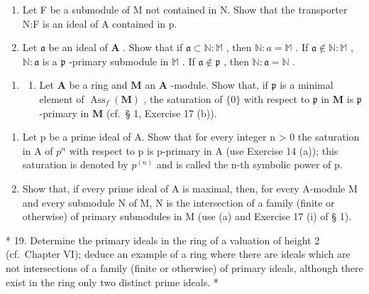 \begin{enumerate}
\def\labelenumi{(\alph{enumi})}
\item
  Let F be a submodule of M not contained in N. Show that the transporter N:F is an ideal of A contained in p.
\item
  Let \(\mathfrak{a}\) be an ideal of \(\mathbf{A}\) . Show that if \(\mathfrak{a} \subset \mathbb{N}: \mathbb{M}\) , then \(\mathbb{N}: a = \mathbb{M}\) . If \(\mathfrak{a} \notin \mathbb{N}: \mathbb{M}\) , \(\mathbb{N}: \mathfrak{a}\) is a \(\mathfrak{p}\) -primary submodule in \(\mathbb{M}\) . If \(\mathfrak{a} \notin \mathfrak{p}\) , then \(\mathbb{N}: \mathfrak{a} = \mathbb{N}\) .
\end{enumerate}

\begin{enumerate}
\def\labelenumi{\arabic{enumi}.}
\setcounter{enumi}{17}
\tightlist
\item
  \begin{enumerate}
  \def\labelenumii{(\alph{enumii})}
  \tightlist
  \item
    Let \(\mathbf{A}\) be a ring and \(\mathbf{M}\) an \(\mathbf{A}\) -module. Show that, if \(\mathfrak{p}\) is a minimal element of \(\operatorname{Ass}_f(\mathbf{M})\) , the saturation of \(\{0\}\) with respect to \(\mathfrak{p}\) in \(\mathbf{M}\) is \(\mathfrak{p}\) -primary in \(\mathbf{M}\) (cf.~§ 1, Exercise 17 (b)).
  \end{enumerate}
\end{enumerate}

\begin{enumerate}
\def\labelenumi{(\alph{enumi})}
\setcounter{enumi}{1}
\item
  Let p be a prime ideal of A. Show that for every integer n \textgreater{} 0 the saturation in A of \(p^{n}\) with respect to p is p-primary in A (use Exercise 14 (a)); this saturation is denoted by \(p^{(n)}\) and is called the n-th symbolic power of p.
\item
  Show that, if every prime ideal of A is maximal, then, for every A-module M and every submodule N of M, N is the intersection of a family (finite or otherwise) of primary submodules in M (use (a) and Exercise 17 (i) of § 1).
\end{enumerate}

* 19. Determine the primary ideals in the ring of a valuation of height 2 (cf.~Chapter VI); deduce an example of a ring where there are ideals which are not intersections of a family (finite or otherwise) of primary ideals, although there exist in the ring only two distinct prime ideals. *

